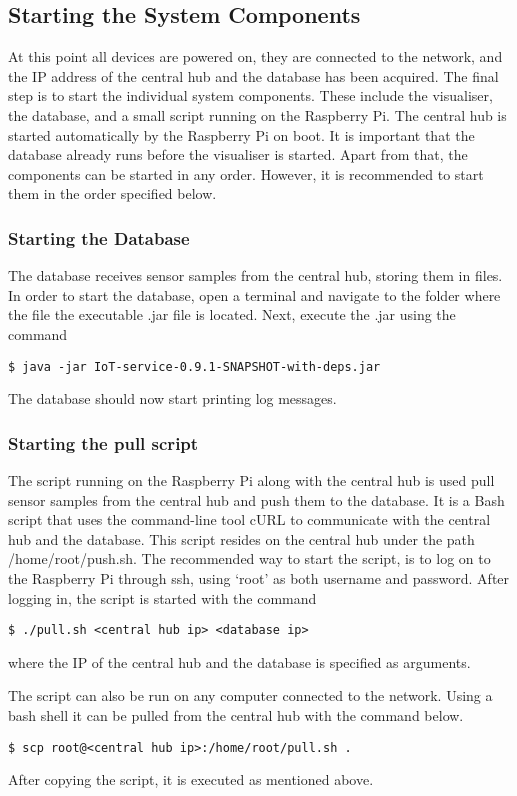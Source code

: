 \documentclass[../document.tex]{subfiles}
\begin{document}
\subsection{Starting the System Components}
At this point all devices are powered on, they are connected to the network, and the IP address of the central hub and the database has been acquired. The final step is to start the individual system components. These include the visualiser, the database, and a small script running on the Raspberry Pi. The central hub is started automatically by the Raspberry Pi on boot. It is important that the database already runs before the visualiser is started. Apart from that, the components can be started in any order. However, it is recommended to start them in the order specified below.

\subsubsection{Starting the Database}
The database receives sensor samples from the central hub, storing them in files. In order to start the database, open a terminal and navigate to the folder where the file the executable .jar file is located. Next, execute the .jar using the command
\begin{lstlisting}
$ java -jar IoT-service-0.9.1-SNAPSHOT-with-deps.jar
\end{lstlisting}
The database should now start printing log messages.



\subsubsection{Starting the pull script}
The script running on the Raspberry Pi along with the central hub is used pull sensor samples from the central hub and push them to the database. It is a Bash script that uses the command-line tool cURL to communicate with the central hub and the database. This script resides on the central hub under the path /home/root/push.sh. The recommended way to start the script, is to log on to the Raspberry Pi through ssh, using ‘root’ as both username and password. After logging in, the script is started with the command
\begin{lstlisting}
$ ./pull.sh <central hub ip> <database ip>
\end{lstlisting}
where the IP of the central hub and the database is specified as arguments.

The script can also be run on any computer connected to the network. Using a bash shell it can be pulled from the central hub with the command below.
\begin{lstlisting}[caption=Bash command to copy the central hub script. Note the period at the end.]
$ scp root@<central hub ip>:/home/root/pull.sh .
\end{lstlisting}
After copying the script, it is executed as mentioned above.
\end{document}
